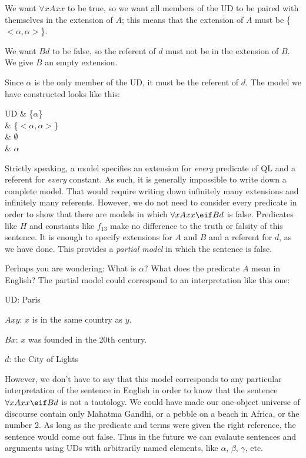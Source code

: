 We want $\forall x Axx$ to be true, so we want all members of the UD to be paired with themselves in the extension of $A$; this means that the extension of $A$ must be \{$<\alpha,\alpha>$\}.

We want $Bd$ to be false, so the referent of $d$ must not be in the extension of $B$. We give $B$ an empty extension.

Since $\alpha$ is the only member of the UD, it must be the referent of $d$. The model we have constructed looks like this:
\begin{partialmodel}
	UD			& \{$\alpha$\}\\
	 	& \{$<\alpha, \alpha>$\}\\
		& $\emptyset$\\
		& $\alpha$
\end{partialmodel}

Strictly speaking, a model specifies an extension for \emph{every} predicate of QL and a referent for \emph{every} constant. As such, it is generally impossible to write down a complete model. That would require writing down infinitely many extensions and infinitely many referents. However, we do not need to consider every predicate in order to show that there are models in which $\forall xAxx \eif Bd$ is false. Predicates like $H$ and constants like $f_{13}$ make no difference to the truth or falsity of this sentence. It is enough to specify extensions for $A$ and $B$ and a referent for $d$, as we have done. This provides a \emph{partial model} in which the sentence is false.

Perhaps you are wondering: What is $\alpha$? What does the predicate $A$ mean in English? The partial model could correspond to an interpretation like this one:
\begin{ekey}
\item[UD:] Paris
\item[$Axy$:] $x$ is in the same country as $y$.
\item[$Bx$:] $x$ was founded in the 20th century.
\item[$d$:] the City of Lights
\end{ekey}

However, we don't have to say that this model corresponds to any particular interpretation of the sentence in English in order to know that the sentence $\forall xAxx \eif Bd$  is not a tautology. We could have made our one-object universe of discourse contain only Mahatma Gandhi, or a pebble on a beach in Africa, or the number 2. As long as the predicate and terms were given the right reference, the sentence would come out false. Thus in the future we can evalaute sentences and arguments using UDs with arbitrarily named elements, like $\alpha$, $\beta$, $\gamma$, etc. 

